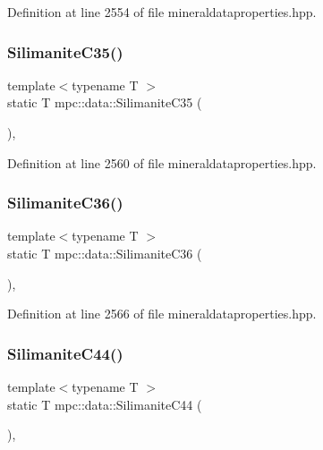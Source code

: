 Definition at line 2554 of file mineraldataproperties.\+hpp.

\mbox{\label{namespacempc_1_1data_a2f3aa9df26c1a8228a84731f018c5f5e}} 
\subsubsection{\texorpdfstring{Silimanite\+C35()}{SilimaniteC35()}}
{\footnotesize\ttfamily template$<$typename T $>$ \\
static T mpc\+::data\+::\+Silimanite\+C35 (\begin{DoxyParamCaption}{ }\end{DoxyParamCaption})\hspace{0.3cm}{\ttfamily [inline]}, {\ttfamily [static]}}



Definition at line 2560 of file mineraldataproperties.\+hpp.

\mbox{\label{namespacempc_1_1data_a70225c66a37f2a35f044f6e785951c5a}} 
\subsubsection{\texorpdfstring{Silimanite\+C36()}{SilimaniteC36()}}
{\footnotesize\ttfamily template$<$typename T $>$ \\
static T mpc\+::data\+::\+Silimanite\+C36 (\begin{DoxyParamCaption}{ }\end{DoxyParamCaption})\hspace{0.3cm}{\ttfamily [inline]}, {\ttfamily [static]}}



Definition at line 2566 of file mineraldataproperties.\+hpp.

\mbox{\label{namespacempc_1_1data_ab7cf58f8974b6bc804a264f1cfd08d94}} 
\subsubsection{\texorpdfstring{Silimanite\+C44()}{SilimaniteC44()}}
{\footnotesize\ttfamily template$<$typename T $>$ \\
static T mpc\+::data\+::\+Silimanite\+C44 (\begin{DoxyParamCaption}{ }\end{DoxyParamCaption})\hspace{0.3cm}{\ttfamily [inline]}, {\ttfamily [static]}}



